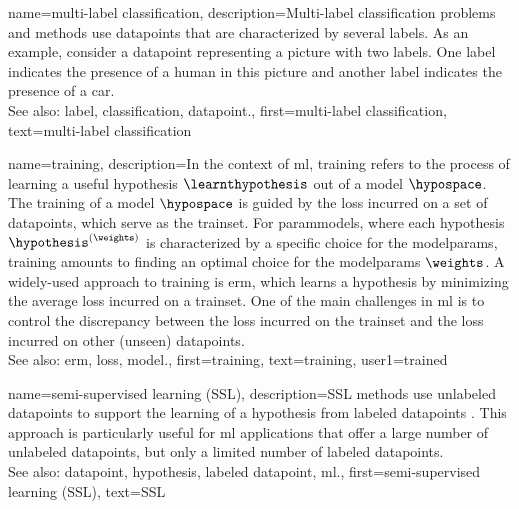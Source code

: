 {name={multi-label classification}, 
	description={Multi-\gls{label} 
		\gls{classification} problems and methods use \glspl{datapoint} 
		that are characterized by several \glspl{label}. As an example, consider a \gls{datapoint} 
		representing a picture with two \glspl{label}. One \gls{label} indicates the presence of a human 
		in this picture and another \gls{label} indicates the presence of a car.
				\\
		See also: \gls{label}, \gls{classification}, \gls{datapoint}.},
	    first={multi-label classification},
	    text={multi-label classification} 
}

{name={training}, 
	description={In the context of \gls{ml}, training refers to the process 
	of learning a useful \gls{hypothesis} $\learnthypothesis$ out of a \gls{model} $\hypospace$. 
	The training of a \gls{model} $\hypospace$ is guided by the \gls{loss} incurred on a set 
	of \glspl{datapoint}, which serve as the \gls{trainset}. For \glspl{parammodel}, 
	where each \gls{hypothesis} $\hypothesis^{(\weights)}$ is characterized by a specific 
	choice for the \glspl{modelparam}, training amounts to finding an optimal choice for the 
	\glspl{modelparam} $\weights$. A widely-used approach to training is \gls{erm}, which 
	learns a \gls{hypothesis} by minimizing the average \gls{loss} incurred on a \gls{trainset}. 
	One of the main challenges in \gls{ml} is to control the discrepancy between the 
	\gls{loss} incurred on the \gls{trainset} and the \gls{loss} incurred on other (unseen) \glspl{datapoint}.
				\\
		See also: \gls{erm}, \gls{loss}, \gls{model}.},
	    first={training},
	    text={training}, 
		user1={trained}
}


{name={semi-supervised learning (SSL)}, 
	description={SSL methods use unlabeled \glspl{datapoint}
		to support the learning of a \gls{hypothesis} from \glspl{labeled datapoint} \cite{SemiSupervisedBook}. 
		This approach is particularly useful for \gls{ml} applications that offer a large number of 
		unlabeled \glspl{datapoint}, but only a limited number of \glspl{labeled datapoint}.
			\\
		See also: \gls{datapoint}, \gls{hypothesis}, \gls{labeled datapoint}, \gls{ml}.}, 
	first={semi-supervised learning (SSL)},
	text={SSL} 
}
	
